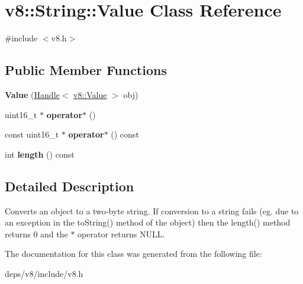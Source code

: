 \hypertarget{classv8_1_1_string_1_1_value}{}\section{v8\+:\+:String\+:\+:Value Class Reference}
\label{classv8_1_1_string_1_1_value}


{\ttfamily \#include $<$v8.\+h$>$}

\subsection*{Public Member Functions}
\begin{DoxyCompactItemize}
\item 
\hypertarget{classv8_1_1_string_1_1_value_a9d6a6d258196a0a34ac257b2abaf659a}{}{\bfseries Value} (\hyperlink{classv8_1_1_local}{Handle}$<$ \hyperlink{classv8_1_1_value}{v8\+::\+Value} $>$ obj)\label{classv8_1_1_string_1_1_value_a9d6a6d258196a0a34ac257b2abaf659a}

\item 
\hypertarget{classv8_1_1_string_1_1_value_ae4f44b1977968de2e9f2ff703437fde3}{}uint16\+\_\+t $\ast$ {\bfseries operator$\ast$} ()\label{classv8_1_1_string_1_1_value_ae4f44b1977968de2e9f2ff703437fde3}

\item 
\hypertarget{classv8_1_1_string_1_1_value_a1cf21001f92284f290a6e550d567e757}{}const uint16\+\_\+t $\ast$ {\bfseries operator$\ast$} () const \label{classv8_1_1_string_1_1_value_a1cf21001f92284f290a6e550d567e757}

\item 
\hypertarget{classv8_1_1_string_1_1_value_a4b5014d7d4d0f60d39f37e421ae2eb91}{}int {\bfseries length} () const \label{classv8_1_1_string_1_1_value_a4b5014d7d4d0f60d39f37e421ae2eb91}

\end{DoxyCompactItemize}


\subsection{Detailed Description}
Converts an object to a two-\/byte string. If conversion to a string fails (eg. due to an exception in the to\+String() method of the object) then the length() method returns 0 and the $\ast$ operator returns N\+U\+L\+L. 

The documentation for this class was generated from the following file\+:\begin{DoxyCompactItemize}
\item 
deps/v8/include/v8.\+h\end{DoxyCompactItemize}
